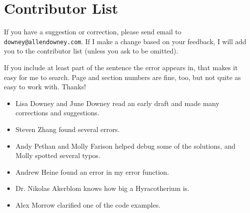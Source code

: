 \documentclass[12pt]{book}
\begin{document}



\section*{Contributor List}


If you have a suggestion or correction, please send email to 
{\tt downey@allendowney.com}.  If I make a change based on your
feedback, I will add you to the contributor list
(unless you ask to be omitted).

If you include at least part of the sentence the
error appears in, that makes it easy for me to search.  Page and
section numbers are fine, too, but not quite as easy to work with.
Thanks!

\small

\begin{itemize}

\item Lisa Downey and June Downey read an early draft and made many
corrections and suggestions.

\item Steven Zhang found several errors.

\item Andy Pethan and Molly Farison helped debug some of the solutions,
and Molly spotted several typos.

\item Andrew Heine found an error in my error function.

\item Dr. Nikolas Akerblom knows how big a Hyracotherium is.

\item Alex Morrow clarified one of the code examples.


\end{itemize}

\normalsize

\clearemptydoublepage

\begin{latexonly}

\tableofcontents

\clearemptydoublepage

\end{latexonly}
\end{document}
